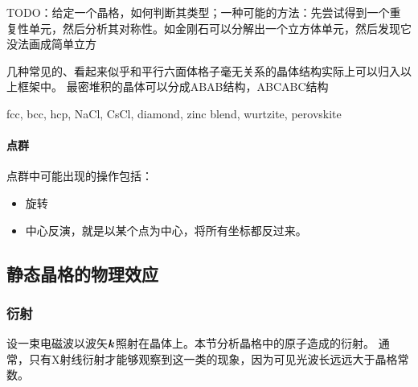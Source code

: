 \documentclass[hyperref, UTF8, a4paper]{ctexart}
\begin{document}
TODO：给定一个晶格，如何判断其类型；一种可能的方法：先尝试得到一个重复性单元，然后分析其对称性。如金刚石可以分解出一个立方体单元，然后发现它没法画成简单立方

几种常见的、看起来似乎和平行六面体格子毫无关系的晶体结构实际上可以归入以上框架中。
最密堆积的晶体可以分成ABAB结构，ABCABC结构

fcc, bcc, hcp, NaCl, CsCl, diamond, zinc blend, wurtzite, perovskite

\paragraph{点群} 点群中可能出现的操作包括：
\begin{itemize}
    \item 旋转
    \item 中心反演，就是以某个点为中心，将所有坐标都反过来。
\end{itemize}


\subsection{静态晶格的物理效应}

\subsubsection{衍射}

设一束电磁波以波矢$\vb*{k}$照射在晶体上。本节分析晶格中的原子造成的衍射。
通常，只有X射线衍射才能够观察到这一类的现象，因为可见光波长远远大于晶格常数。
\end{document}

